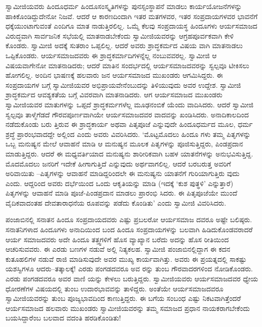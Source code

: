 ಸ್ವಾಮೀಜಿಯವರು ಹಿಂದೂಧರ್ಮ ಹಿಂದೂಸಂಸ್ಕೃತಿಗಳನ್ನು ಪುನಸ್ಸಂಸ್ಥಾಪನೆ ಮಾಡಲು ಕಾರ್ಯಯೋಜನೆಗಳನ್ನು ಹಾಕಿಕೊಂಡಿದ್ದುದೇನೋ ನಿಜವೆ. ಆದರೆ ಆ ಕಾರಣದಿಂದಾಗಿ ಇತರ ಮತಗಳವರ, ಇತರ ಸಂಪ್ರದಾಯಗಳವರ ಭಾವನೆಗೆ ಧಕ್ಕೆಯುಂಟಾಗುವಂತೆ ಎಂದಿಗೂ ಮಾತ ನಾಡುತ್ತಿರಲಿಲ್ಲ. ಒಮ್ಮೆ ಕೆಲವು ಸಂಪ್ರದಾಯಸ್ಥ ಹಿಂದೂಗಳು ಆರ್ಯಸಮಾಜದ ವಿರುದ್ಧವಾಗಿ ಸಾರ್ವಜನಿಕ ಸಭೆಯಲ್ಲಿ ಮಾತನಾಡಬೇಕೆಂದು ಸ್ವಾಮೀಜಿಯವರನ್ನು ಆಗ್ರಹಪೂರ್ವಕವಾಗಿ ಕೇಳಿ ಕೊಂಡರು. ಸ್ವಾಮೀಜಿ ಅದಕ್ಕೆ ಸುತರಾಂ ಒಪ್ಪಲಿಲ್ಲ. ಆದರೆ ಅವರು ಶ್ರಾದ್ಧಕರ್ಮದ ವಿಷಯ ವಾಗಿ ಮಾತನಾಡಲು ಒಪ್ಪಿಕೊಂಡರು. ಆರ್ಯಸಮಾಜದವರು ಈ ಶ್ರಾದ್ಧಕರ್ಮಾದಿಗಳನ್ನೆಲ್ಲ ನಂಬುವವರಲ್ಲ. ಸ್ವಾಮೀಜಿ ಆ ವಿಷಯವಾಗೇನೋ ಮಾತನಾಡಿದರು; ಆದರೆ ಮಾತಿನ ಸಂದರ್ಭದಲ್ಲಿ ಆರ್ಯಸಮಾಜದವರನ್ನು ಸ್ವಲ್ಪವೂ ಟೀಕಿಸಲು ಹೋಗಲಿಲ್ಲ. ಅಂದಿನ ಭಾಷಣಕ್ಕೆ ಹಲವಾರು ಜನ ಆರ್ಯಸಮಾಜದ ಮುಖಂಡರು ಆಗಮಿಸಿದ್ದರು. ಈ ಸಂಪ್ರದಾಯಗಳ ಬಗ್ಗೆ ಸ್ವಾಮೀಜಿಯವರ ಅಭಿಪ್ರಾಯವೇನೆಂಬುದನ್ನು ತಿಳಿಯುವುದು ಅವರ ಉದ್ದೇಶ. ಸ್ವಾಮೀಜಿ ಶ್ರಾದ್ಧಕರ್ಮದ ಆವಶ್ಯಕತೆಯ ಬಗ್ಗೆ ವಿವರವಾಗಿ ಮಾತನಾಡಿದರು. ಆಗ ಆರ್ಯಸಮಾಜದ ಮುಖಂಡರು ಸ್ವಾಮೀಜಿಯವರ ಮಾತುಗಳನ್ನು ಒಪ್ಪದೆ ಶ್ರಾದ್ಧಕರ್ಮಗಳೆಲ್ಲ ಮೂಢನಂಬಿಕೆ ಯೆಂದು ವಾದಿಸಿದರು. ಆದರೆ ಸ್ವಾಮೀಜಿ ಸ್ವಲ್ಪವೂ ತಾಳ್ಮೆಗೆಡದೆ ಗೌರವಪೂರ್ಣವಾಗಿಯೇ ಆರ್ಯಸಮಾಜದವರ ವಾದವನ್ನು ಖಂಡಿಸಿದರು. ಅನಾದಿಕಾಲದಿಂದ ನಡೆದುಕೊಂಡು ಬರು ತ್ತಿರುವ ಈ ಶ್ರಾದ್ಧಕಾರ್ಯ ಅಥವಾ ಪಿತೃಪೂಜೆ ಎನ್ನುವುದೇ ಹಿಂದೂಧರ್ಮದ ಮೂಲ, ಧರ್ಮ ಶ್ರದ್ಧೆ ಪ್ರಾರಂಭವಾದದ್ದೇ ಅಲ್ಲಿಂದ ಎಂದು ಅವರು ವಿವರಿಸಿದರು. ‘ಮೊಟ್ಟಮೊದಲು ಹಿಂದೂ ಗಳು ತಮ್ಮ ಪಿತೃಗಳನ್ನು ಒಬ್ಬ ಮನುಷ್ಯನ ಮೇಲೆ ಆವಾಹನೆ ಮಾಡಿ ಆ ಮನುಷ್ಯನ ಮೂಲಕ ಪಿತೃಗಳನ್ನು ಪೂಜಿಸುತ್ತಿದ್ದರು, ಪಿಂಡಪ್ರದಾನ ಮಾಡುತ್ತಿದ್ದರು. ಆದರೆ ಈ ಮಧ್ಯವರ್ತಿಯಾದ ಮನುಷ್ಯನು ಶಾರೀರಿಕವಾಗಿ ಬಹಳ ಯಾತನೆಗಳನ್ನು ಅನುಭವಿಸುತ್ತಿದ್ದ. ಮೊದಮೊದಲು ಜನರಿಗೆ ಇದೇಕೆ ಹೀಗಾಗುತ್ತಿದೆ ಎನ್ನುವುದು ಅರ್ಥವಾಗಲಿಲ್ಲ. ಆದರೆ ಬರಬರುತ್ತ ಅವರಿಗೆ ಅರಿವಾಯಿತು –ಪಿತೃಗಳನ್ನು ಆವಾಹನೆ ಮಾಡಿದ್ದರಿಂದಲೇ ಈ ಮನುಷ್ಯನು ಯಾತನೆಗೆ ಗುರಿಯಾಗುತ್ತಿರು ವುದು ಎಂದು. ಆದ್ದರಿಂದ ಅವರು ದರ್ಭೆಯಿಂದ ಒಂದು ಆಕೃತಿಯನ್ನು ಮಾಡಿ (ಇದಕ್ಕೆ ‘ಕುಶ ಪುತ್ಥಳಿ’ ಎನ್ನುತ್ತಾರೆ) ಪಿತೃಗಳನ್ನು ಆವಾಹನೆ ಮಾಡಿ ಪೂಜೆ-ಪಿಂಡಪ್ರದಾನ ಮಾಡಲು ಪ್ರಾರಂಭಿ ಸಿದರು. ಈ ಪಿತೃಪೂಜೆಯೇ ಮುಂದೆ ವೈದಿಕವಾದಂತಹ ದೇವತಾರಾಧನೆಯ ರೂಪವನ್ನು ಪಡೆದು ಕೊಂಡಿತು’ ಎಂದು ಸ್ವಾಮೀಜಿ ವಿವರಿಸಿದರು.

ಪಂಜಾಬಿನಲ್ಲಿ ಸನಾತನ ಹಿಂದೂ ಸಂಪ್ರದಾಯದವರು ಎಷ್ಟು ಪ್ರಬಲರೋ ಆರ್ಯಸಮಾಜ ದವರೂ ಅಷ್ಟೇ ಬಲಿಷ್ಠರು. ಸನಾತನಿಗಳಾದ ಹಿಂದೂಗಳು ಅನಾದಿಯಿಂದ ಬಂದ ಹಿಂದೂ ಸಂಪ್ರದಾಯಗಳನ್ನು ಬಲವಾಗಿ ಹಿಡಿದುಕೊಂಡವರಾದರೆ ಆರ್ಯ ಸಮಾಜದವರು ಅದೇ ಹಿಂದೂ ತತ್ತ್ವಗಳಿಗೆ ಹೊಸ ವ್ಯಾಖ್ಯಾನ ಬರೆದು ಅದನ್ನು ಹೊಸ ರೀತಿಯಿಂದ ಆಚರಿಸುವವರು. ಈ ಎರಡು ಬಣಗಳ ನಡುವೆ ಅಲ್ಲಿ ನಿತ್ಯಕಲಹ. ಸ್ವಾಮೀಜಿ ಪಂಜಾಬಿನಲ್ಲಿದ್ದಾಗ ಈ ಕದನ ಕುತೂಹಲಿಗಳ ನಡುವೆ ರಾಜಿ ಮಾಡಿಸುವುದೇ ಅವರ ಮುಖ್ಯ ಕಾರ್ಯವಾಗಿತ್ತು. ಅವರು ಈ ಪ್ರಯತ್ನದಲ್ಲಿ ಸಾಕಷ್ಟು ಯಶಸ್ವಿಗಳೂ ಆದರು–ತತ್ಕಾಲಕ್ಕೆ! ಎರಡು ಪಂಗಡದವರೂ ಅವ ರನ್ನು ತುಂಬ ಗೌರವಾದರಗಳಿಂದ ನೋಡಿಕೊಂಡರು. ಎರಡು ಪಂಗಡದವರೂ ಅವರ ವಾಣಿ ಯನ್ನು ಕೇಳಲು ಬರುತ್ತಿದ್ದರು. ಸ್ವಾಮೀಜಿಯವರು ಆರ್ಯಸಮಾಜದವರ ಧ್ಯೇಯ ಧೋರಣೆಗಳ ವಿಷಯದಲ್ಲಿ ತುಂಬ ಉದಾರಭಾವವನ್ನು ತಾಳಿದ್ದರು. ಅಂತೆಯೇ ಆರ್ಯಸಮಾಜದವರೂ ಸ್ವಾಮೀಜಿಯವರನ್ನು ತುಂಬ ಪೂಜ್ಯಭಾವದಿಂದ ಕಾಣುತ್ತಿದ್ದರು. ಈ ಬಗೆಯ ಸಂಬಂಧ ಎಷ್ಟು ನಿಕಟವಾಗಿತ್ತೆಂದರೆ ಆರ್ಯಸಮಾಜದ ಹಲವಾರು ಮುಖಂಡರು ಸ್ವಾಮೀಜಿಯವರನ್ನು ತಮ್ಮ ಸಮಾಜದ ಪ್ರಧಾನ ನಾಯಕರಾಗಬೇಕೆಂದು ಬಯಸಿದ್ದಾರೆಂಬ ಬಲವಾದ ವದಂತಿ ಹರಡಿಕೊಂಡಿತು!

